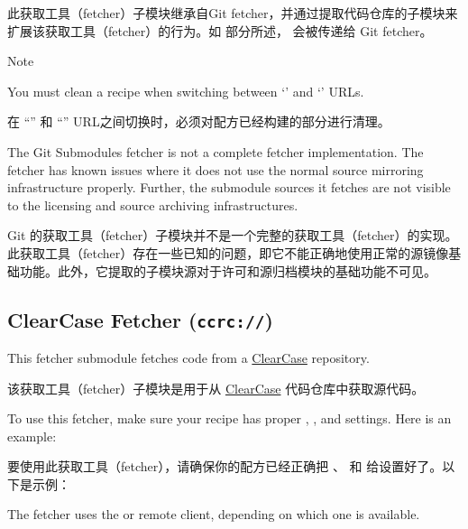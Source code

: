 此获取工具（fetcher）子模块继承自Git fetcher，并通过提取代码仓库的子模块来扩展该获取工具（fetcher）的行为。如  部分所述， 会被传递给 Git fetcher。

\medskip
\begin{noteblock}{Note}%

You must clean a recipe when switching between `' and `' URLs.

\medskip
在 ``'' 和 ``'' URL之间切换时，必须对配方已经构建的部分进行清理。

\medskip
The Git Submodules fetcher is not a complete fetcher implementation. The fetcher has known issues where it does not use the normal source mirroring infrastructure properly. Further, the submodule sources it fetches are not visible to the licensing and source archiving infrastructures.

\medskip
Git 的获取工具（fetcher）子模块并不是一个完整的获取工具（fetcher）的实现。此获取工具（fetcher）存在一些已知的问题，即它不能正确地使用正常的源镜像基础功能。此外，它提取的子模块源对于许可和源归档模块的基础功能不可见。
\end{noteblock}

\subsection{ClearCase Fetcher (\texttt{ccrc://})}

This fetcher submodule fetches code from a \href{http://en.wikipedia.org/wiki/Rational_ClearCase}{ClearCase} repository.

该获取工具（fetcher）子模块是用于从 \href{http://en.wikipedia.org/wiki/Rational_ClearCase}{ClearCase} 代码仓库中获取源代码。

To use this fetcher, make sure your recipe has proper , , and  settings. Here is an example:

要使用此获取工具（fetcher），请确保你的配方已经正确把 、 和  给设置好了。以下是示例：


The fetcher uses the  or  remote client, depending on which one is available.

